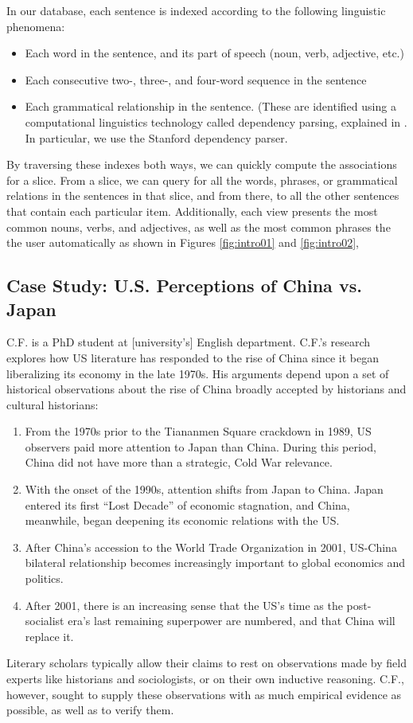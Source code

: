 \documentclass{sig-alternate}
\begin{document}
 In our database, each sentence is indexed according to the following linguistic phenomena:
\begin{itemize}
  \item Each word in the sentence, and its part of speech (noun, verb, adjective, etc.)
  \item Each consecutive two-, three-, and four-word sequence in the sentence
  \item Each grammatical relationship in the sentence. (These are identified using a computational linguistics technology called dependency parsing,  explained in \cite{jurafsky_chapter_2009}. In particular, we use the Stanford dependency parser\cite{klein_accurate_2003}.
\end{itemize}
By traversing these indexes both ways, we can quickly compute the associations for a slice. From a slice, we can query for all the words, phrases, or grammatical relations in the sentences in that slice, and from there, to all the other sentences that contain each particular item.  Additionally, each view presents the most common nouns, verbs, and adjectives, as well as the most common phrases the the user automatically as shown in Figures \ref{fig:intro01} and \ref{fig:intro02}, 


\subsection{Case Study: U.S. Perceptions of China vs. Japan}

C.F. is a PhD student at [university's] English department. C.F.'s research explores how US literature has responded to the rise of China since it began liberalizing its economy in the late 1970s.  His arguments depend upon a set of historical observations about the rise of China  broadly accepted by historians and cultural historians: 
\begin{enumerate}
\item From the 1970s prior to the Tiananmen Square crackdown in 1989, US observers paid more attention to Japan than China. During this period, China did not have  more than a strategic, Cold War relevance. 
\item With the onset of the 1990s, attention shifts from Japan to China. Japan entered its first ``Lost Decade'' of economic stagnation, and China, meanwhile, began deepening its economic relations with the US.
\item After China's accession to the World Trade Organization in 2001, US-China bilateral relationship becomes increasingly important to global economics and politics.
\item After 2001, there is an increasing sense that the US's time as the post-socialist era's last remaining superpower are numbered, and that China will replace it.
\end{enumerate}
Literary scholars typically allow their claims to rest on observations made by field experts like historians and sociologists, or on their own inductive reasoning. C.F., however, sought to supply these observations with as much empirical evidence as possible, as well as to verify them.
\end{document}
